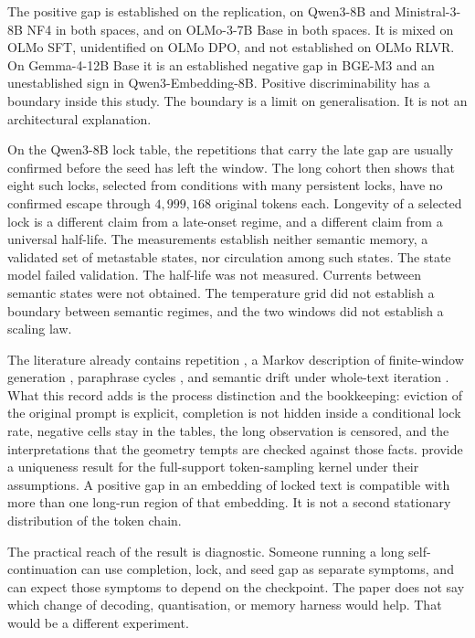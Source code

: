 \documentclass[10pt]{article}
\begin{document}
The positive gap is established on the replication, on Qwen3-8B and
Ministral-3-8B NF4 in both spaces, and on OLMo-3-7B Base in both spaces.
It is mixed on OLMo SFT, unidentified on OLMo DPO, and not established
on OLMo RLVR.
On Gemma-4-12B Base it is an established negative gap in BGE-M3 and an
unestablished sign in Qwen3-Embedding-8B.
Positive discriminability has a boundary inside this study.
The boundary is a limit on generalisation.
It is not an architectural explanation.

On the Qwen3-8B lock table, the repetitions that carry the late gap are
usually confirmed before the seed has left the window.
The long cohort then shows that eight such locks, selected from
conditions with many persistent locks, have no confirmed escape through
$4{,}999{,}168$ original tokens each. %
Longevity of a selected lock is a different claim from a late-onset
regime, and a different claim from a universal half-life.
The measurements establish neither semantic memory, a validated set of
metastable states, nor circulation among such states.
The state model failed validation.
The half-life was not measured.
Currents between semantic states were not obtained.
The temperature grid did not establish a boundary between semantic
regimes, and the two windows did not establish a scaling law.

The literature already contains repetition \citep{holtzman2020,xu2022},
a Markov description of finite-window generation \citep{zekri2024},
paraphrase cycles \citep{wang2025}, and semantic drift under whole-text
iteration \citep{geng2026}.
What this record adds is the process distinction and the bookkeeping:
eviction of the original prompt is explicit, completion is not hidden
inside a conditional lock rate, negative cells stay in the tables, the
long observation is censored, and the interpretations that the geometry
tempts are checked against those facts.
\citet{zekri2024} provide a uniqueness result for the full-support
token-sampling kernel under their assumptions.
A positive gap in an embedding of locked text is compatible with more
than one long-run region of that embedding.
It is not a second stationary distribution of the token chain.

The practical reach of the result is diagnostic.
Someone running a long self-continuation can use completion, lock, and
seed gap as separate symptoms, and can expect those symptoms to depend
on the checkpoint.
The paper does not say which change of decoding, quantisation, or
memory harness would help.
That would be a different experiment.
\end{document}
